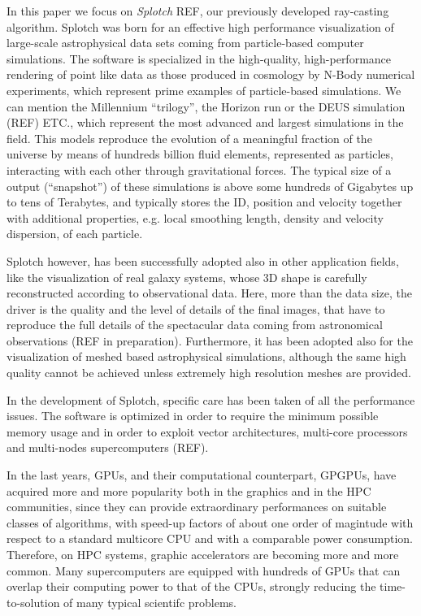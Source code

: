 \documentclass[11pt]{article}
\begin{document}
In this paper we focus on {\it Splotch} REF, our previously developed ray-casting
algorithm. Splotch was born for an effective high performance visualization of large-scale 
astrophysical data sets coming from particle-based computer simulations. The software is 
specialized in the high-quality, high-performance rendering of point like data as those 
produced in cosmology by N-Body numerical experiments, which 
represent prime examples of particle-based simulations. We can mention 
the Millennium ``trilogy'', the Horizon run or the DEUS simulation (REF) ETC., which
represent the most advanced and largest simulations in the field. 
This models reproduce the evolution of a meaningful fraction
of the universe by means of hundreds billion fluid elements, represented as particles,
interacting with each other through gravitational
forces. The typical size of a output (``snapshot'') of these simulations is above some hundreds 
of Gigabytes up to tens of Terabytes, and typically stores the
ID, position and velocity together with additional properties, e.g.
local smoothing length, density and velocity dispersion, of each particle.

Splotch however, has been successfully adopted also in other application fields,
like the visualization of real galaxy systems, whose 3D shape is carefully reconstructed
according to observational data. Here, more than the data size, the driver is
the quality and the level of details of the final images,
that have to reproduce the full details of the
spectacular data coming from astronomical observations (REF in preparation). Furthermore,
it has been adopted also for the visualization of meshed based astrophysical simulations, 
although the same high quality cannot be achieved unless extremely high resolution
meshes are provided. 

In the development of Splotch, specific care has been taken of all the performance 
issues. The software is optimized in order to require the minimum possible
memory usage and in order to exploit vector architectures, multi-core processors 
and multi-nodes supercomputers (REF). 

In the last years, 
GPUs, and their computational counterpart, GPGPUs, have 
acquired more and more popularity both in the graphics and in the HPC 
communities, since they can provide extraordinary performances on suitable
classes of algorithms, with speed-up factors of about one order of magintude with respect to 
a standard multicore CPU and with a comparable power consumption.
Therefore, on HPC systems, graphic accelerators are becoming more and more common. 
Many supercomputers are equipped with hundreds of GPUs that can overlap 
their computing power to that of the CPUs, strongly reducing the time-to-solution
of many typical scientifc problems.
\end{document}
